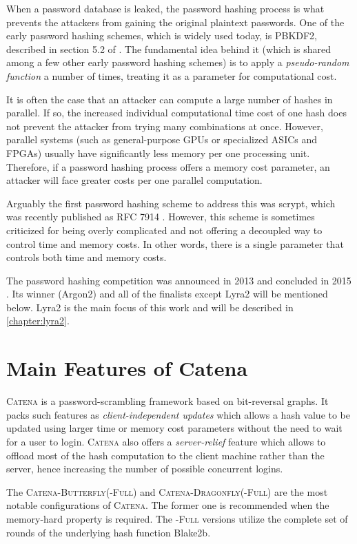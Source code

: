 When a password database is leaked, the password hashing process is what prevents the attackers from gaining the original plaintext passwords. One of the early password hashing schemes, which is widely used today, is PBKDF2, described in section 5.2 of \cite{moriarty:2017:pkcs}. The fundamental idea behind it (which is shared among a few other early password hashing schemes) is to apply a \emph{pseudo-random function} a number of times, treating it as a parameter for computational cost.

It is often the case that an attacker can compute a large number of hashes in parallel. If so, the increased individual computational time cost of one hash does not prevent the attacker from trying many combinations at once. However, parallel systems (such as general-purpose GPUs or specialized ASICs and FPGAs) usually have significantly less memory per one processing unit. Therefore, if a password hashing process offers a memory cost parameter, an attacker will face greater costs per one parallel computation.

Arguably the first password hashing scheme to address this was scrypt, which was recently published as RFC 7914 \cite{percival:2016:scrypt}. However, this scheme is sometimes criticized for being overly complicated and not offering a decoupled way to control time and memory costs. In other words, there is a single parameter that controls both time and memory costs.

The password hashing competition was announced in 2013 and concluded in 2015 \cite{wetzels:2016:phc}. Its winner (Argon2) and all of the finalists except Lyra2 will be mentioned below. Lyra2 is the main focus of this work and will be described in \ref{chapter:lyra2}.

\section{Main Features of Catena}

\textsc{Catena} is a password-scrambling framework based on bit-reversal graphs. It packs such features as \emph{client-independent updates} which allows a hash value to be updated using larger time or memory cost parameters without the need to wait for a user to login. \textsc{Catena} also offers a \emph{server-relief} feature which allows to offload most of the hash computation to the client machine rather than the server, hence increasing the number of possible concurrent logins.

The \textsc{Catena-Butterfly(-Full)} and \textsc{Catena-Dragonfly(-Full)} are the most notable configurations of \textsc{Catena}. The former one is recommended when the memory-hard property is required. The \textsc{-Full} versions utilize the complete set of rounds of the underlying hash function Blake2b.


